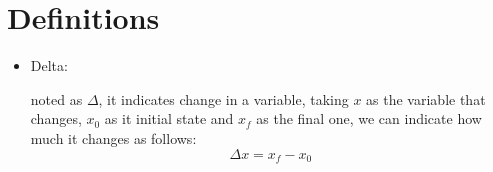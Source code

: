 \documentclass[11pt,fleqn]{book} %
\begin{document}
\section{Definitions}
\begin{itemize}
    \item Delta: 
    
    noted as $ \Delta $, it indicates change in a variable, taking $ x $ as the variable
    that changes, $ x_0 $ as it initial state and $ x_f $ as the final one, we can indicate how much it
    changes as follows: $$ \Delta x = x_f - x_0 $$
\end{itemize}



\end{document}
